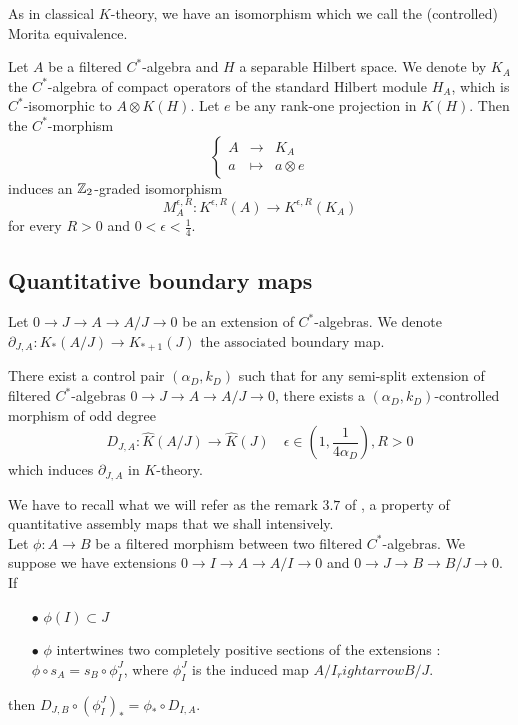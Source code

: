 As in classical $K$-theory, we have an isomorphism which we call the (controlled) Morita equivalence.
\begin{prop}
Let $A$ be a filtered $C^*$-algebra and $H$ a separable Hilbert space. We denote by $K_A$ the $C^*$-algebra of compact operators of the standard Hilbert module $H_A$, which is $C^*$-isomorphic to $A\otimes K(H)$. Let $e$ be any rank-one projection in $K(H)$. Then the $C^*$-morphism 
\[\left\{\begin{array}{lll} A & \rightarrow & K_A \\ a &\mapsto & a\otimes e\end{array}\right.\]
induces an $\mathbb Z_2$-graded isomorphism
\[M_A^{\epsilon, R} : K^{\epsilon , R}(A)\rightarrow K^{\epsilon , R}(K_A)\]
for every $R>0$ and $0< \epsilon <\frac{1}{4}$.
\end{prop}

\subsection{Quantitative boundary maps}

Let $0\rightarrow J \rightarrow A\rightarrow A/J\rightarrow 0$ be an extension of $C^*$-algebras. We denote $\partial_{J,A}: K_*(A/J)\rightarrow K_{*+1}(J)$ the associated boundary map.

\begin{prop}
There exist a control pair $(\alpha_D,k_D)$ such that for any semi-split extension of filtered $C^*$-algebras $0\rightarrow J \rightarrow A\rightarrow A/J\rightarrow 0$, there exists a $(\alpha_D,k_D)$-controlled morphism of odd degree
\[D_{J,A} : \hat K(A/J)\rightarrow \hat K(J)\quad \epsilon \in (1,\frac{1}{4\alpha_D}),R>0\]
which induces $\partial_{J,A}$ in $K$-theory.
\end{prop}

We have to recall what we will refer as the remark $3.7$ of \cite{OY2}, a property of quantitative assembly maps that we shall intensively.\\
Let $\phi: A \rightarrow B$ be a filtered morphism between two filtered $C^*$-algebras. We suppose we have extensions $0\rightarrow I \rightarrow A\rightarrow A/I\rightarrow 0$ and $0\rightarrow J \rightarrow B\rightarrow B/J\rightarrow 0$. If 
\begin{itemize}
\item[$\bullet$]$\phi(I)\subset J$
\item[$\bullet$]$\phi$ intertwines two completely positive sections of the extensions : $\phi \circ s_A = s_B \circ \phi_{I}^J$, where $\phi_{I}^J$ is the induced map $A/I_rightarrow B/J$.
\end{itemize} 
then $D_{J,B}\circ (\phi_{I}^J)_*=\phi_*\circ D_{I,A}$.

